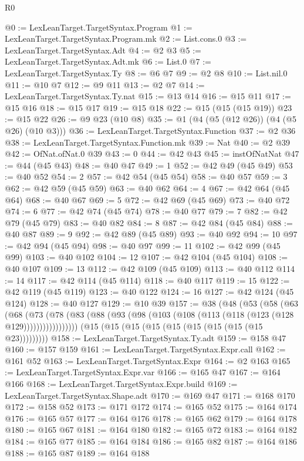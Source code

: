 \begin{lexlean}{R0}
\begin{coremodule}
@0 := LexLeanTarget.TargetSyntax.Program
@1 := LexLeanTarget.TargetSyntax.Program.mk
@2 := List.cons.{0}
@3 := LexLeanTarget.TargetSyntax.Adt
@4 := @2 @3
@5 := LexLeanTarget.TargetSyntax.Adt.mk
@6 := List.{0}
@7 := LexLeanTarget.TargetSyntax.Ty
@8 := @6 @7
@9 := @2 @8
@10 := List.nil.{0}
@11 := @10 @7
@12 := @9 @11
@13 := @2 @7
@14 := LexLeanTarget.TargetSyntax.Ty.nat
@15 := @13 @14
@16 := @15 @11
@17 := @15 @16
@18 := @15 @17
@19 := @15 @18
@22 := @15 (@15 (@15 @19))
@23 := @15 @22
@26 := @9 @23 (@10 @8)
@35 := @1 (@4 (@5 (@12 @26)) (@4 (@5 @26) (@10 @3)))
@36 := LexLeanTarget.TargetSyntax.Function
@37 := @2 @36
@38 := LexLeanTarget.TargetSyntax.Function.mk
@39 := Nat
@40 := @2 @39
@42 := OfNat.ofNat.{0} @39
@43 := 0
@44 := @42 @43
@45 := instOfNatNat
@47 := @44 (@45 @43)
@48 := @40 @47
@49 := 1
@52 := @42 @49 (@45 @49)
@53 := @40 @52
@54 := 2
@57 := @42 @54 (@45 @54)
@58 := @40 @57
@59 := 3
@62 := @42 @59 (@45 @59)
@63 := @40 @62
@64 := 4
@67 := @42 @64 (@45 @64)
@68 := @40 @67
@69 := 5
@72 := @42 @69 (@45 @69)
@73 := @40 @72
@74 := 6
@77 := @42 @74 (@45 @74)
@78 := @40 @77
@79 := 7
@82 := @42 @79 (@45 @79)
@83 := @40 @82
@84 := 8
@87 := @42 @84 (@45 @84)
@88 := @40 @87
@89 := 9
@92 := @42 @89 (@45 @89)
@93 := @40 @92
@94 := 10
@97 := @42 @94 (@45 @94)
@98 := @40 @97
@99 := 11
@102 := @42 @99 (@45 @99)
@103 := @40 @102
@104 := 12
@107 := @42 @104 (@45 @104)
@108 := @40 @107
@109 := 13
@112 := @42 @109 (@45 @109)
@113 := @40 @112
@114 := 14
@117 := @42 @114 (@45 @114)
@118 := @40 @117
@119 := 15
@122 := @42 @119 (@45 @119)
@123 := @40 @122
@124 := 16
@127 := @42 @124 (@45 @124)
@128 := @40 @127
@129 := @10 @39
@157 := @38
    (@48
      (@53
        (@58
          (@63
            (@68
              (@73
                (@78 (@83 (@88 (@93 (@98 (@103 (@108 (@113 (@118 (@123 (@128 @129)))))))))))))))))
    (@15 (@15 (@15 (@15 (@15 (@15 (@15 (@15 (@15 @23)))))))))
@158 := LexLeanTarget.TargetSyntax.Ty.adt
@159 := @158 @47
@160 := @157 @159
@161 := LexLeanTarget.TargetSyntax.Expr.call
@162 := @161 @52
@163 := LexLeanTarget.TargetSyntax.Expr
@164 := @2 @163
@165 := LexLeanTarget.TargetSyntax.Expr.var
@166 := @165 @47
@167 := @164 @166
@168 := LexLeanTarget.TargetSyntax.Expr.build
@169 := LexLeanTarget.TargetSyntax.Shape.adt
@170 := @169 @47
@171 := @168 @170
@172 := @158 @52
@173 := @171 @172
@174 := @165 @52
@175 := @164 @174
@176 := @165 @57
@177 := @164 @176
@178 := @165 @62
@179 := @164 @178
@180 := @165 @67
@181 := @164 @180
@182 := @165 @72
@183 := @164 @182
@184 := @165 @77
@185 := @164 @184
@186 := @165 @82
@187 := @164 @186
@188 := @165 @87
@189 := @164 @188

\end{coremodule}
\end{lexlean}
